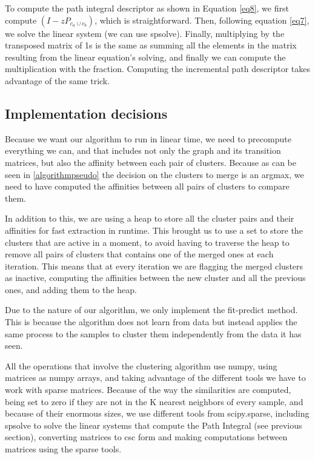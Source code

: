 \documentclass[
	10pt,
	parskip=half-,	
	paper=a4,
	english
	]{scrartcl}
\begin{document}
To compute the path integral descriptor as shown in Equation \ref{eq8}, we first compute \((I - zP_{c_a \cup c_b})\), which is straightforward. Then, following equation \ref{eq7}, we solve the linear system (we can use spsolve). Finally, multiplying by the transposed matrix of 1s is the same as summing all the elements in the matrix resulting from the linear equation's solving, and finally we can compute the multiplication with the fraction. Computing the incremental path descriptor takes advantage of the same trick. 

\subsection{Implementation decisions}

Because we want our algorithm to run in linear time, we need to precompute everything we can, and that includes not only the graph and its transition matrices, but also the affinity between each pair of clusters. Because as can be seen in \ref{algorithmpseudo} the decision on the clusters to merge is an argmax, we need to have computed the affinities between all pairs of clusters to compare them.

In addition to this, we are using a heap to store all the cluster pairs and their affinities for fast extraction in runtime. This brought us to use a set to store the clusters that are active in a moment, to avoid having to traverse the heap to remove all pairs of clusters that contains one of the merged ones at each iteration. This means that at every iteration we are flagging the merged clusters as inactive, computing the affinities between the new cluster and all the previous ones, and adding them to the heap.

Due to the nature of our algorithm, we only implement the fit-predict method. This is because the algorithm does not learn from data but instead applies the same process to the samples to cluster them independently from the data it has seen.

All the operations that involve the clustering algorithm use numpy, using matrices as numpy arrays, and taking advantage of the different tools we have to work with sparse matrices. Because of the way the similarities are computed, being set to zero if they are not in the K nearest neighbors of every sample, and because of their enormous sizes, we use different tools from scipy.sparse, including spsolve to solve the linear systems that compute the Path Integral (see previous section), converting matrices to csc form and making computations between matrices using the sparse tools.
\end{document}
